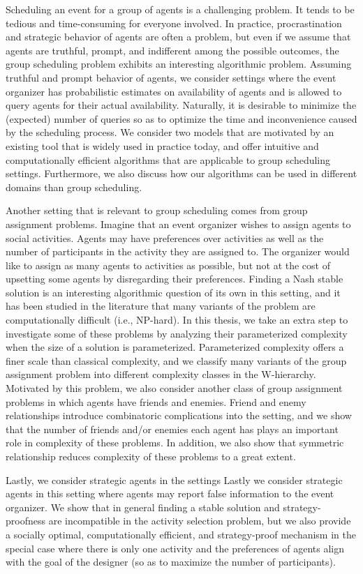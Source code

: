 Scheduling an event for a group of agents is a challenging problem. 
It tends to be tedious and time-consuming for everyone involved. 
In practice, procrastination and strategic behavior of agents are often a problem, but even if we assume that agents are truthful, prompt, and indifferent among the possible outcomes, the group scheduling problem exhibits an interesting algorithmic problem. Assuming truthful and prompt behavior of agents, we consider settings where the event organizer has probabilistic estimates on availability of agents and is allowed to query agents for their actual availability. Naturally, it is desirable to minimize the (expected) number of queries so as to optimize the time and inconvenience caused by the scheduling process. We consider two models that are motivated by an existing tool that is widely used in practice today, and offer intuitive and computationally efficient algorithms that are applicable to group scheduling settings. Furthermore, we also discuss how our algorithms can be used in different domains than group scheduling. 

Another setting that is relevant to group scheduling comes from group assignment problems. Imagine that an event organizer wishes to assign agents to social activities. Agents may have preferences over activities as well as the number of participants in the activity they are assigned to. The organizer would like to assign as many agents to activities as possible, but not at the cost of upsetting some agents by disregarding their preferences. Finding a Nash stable solution is an interesting algorithmic question of its own in this setting, and it has been studied in the literature that many variants of the problem are computationally difficult (i.e., NP-hard). In this thesis, we take an extra step to investigate some of these problems by analyzing their parameterized complexity when the size of a solution is parameterized. Parameterized complexity offers a finer scale than classical complexity, and we classify many variants of the group assignment problem into different complexity classes in the W-hierarchy. Motivated by this problem, we also consider another class of group assignment problems in which agents have friends and enemies. Friend and enemy relationships introduce combinatoric complications into the setting, and we show that the number of friends and/or enemies each agent has plays an important role in complexity of these problems. In addition, we also show that symmetric relationship reduces complexity of these problems to a great extent.

Lastly, we consider strategic agents in the settings 
Lastly we consider strategic agents in this setting where agents may report false information to the event organizer. We show that in general finding a stable solution and strategy-proofness are incompatible in the activity selection problem, but we also provide a socially optimal, computationally efficient, and strategy-proof mechanism in the special case where there is only one activity and the preferences of agents align with the goal of the designer (so as to maximize the number of participants).
